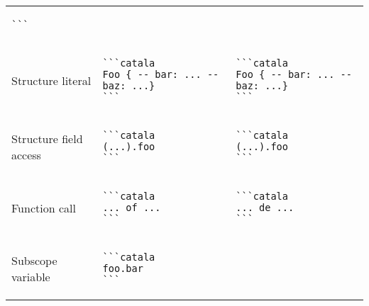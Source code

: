 \documentclass[a3paper,landscape]{article}
\begin{document}
\begin{multicols*}{2}
\begin{center}
\begin{tabular}{p{}p{}p{}}
\begin{verbatim}
```
\end{verbatim}
      \vspace*{-1.75em}
      \\
      Structure literal                 &
      \vspace*{-1.75em}
      \begin{verbatim}
```catala
Foo { -- bar: ... -- baz: ...}
```
\end{verbatim}
      \vspace*{-1.75em}
                                        &
      \vspace*{-1.75em}
      \begin{verbatim}
```catala
Foo { -- bar: ... -- baz: ...}
```
\end{verbatim}
      \vspace*{-1.75em}
      \\
      Structure field access            &
      \vspace*{-1.75em}
      \begin{verbatim}
```catala
(...).foo
```
\end{verbatim}
      \vspace*{-1.75em}
                                        &
      \vspace*{-1.75em}
      \begin{verbatim}
```catala
(...).foo
```
\end{verbatim}
      \vspace*{-1.75em}
      \\
      Function call                     &
      \vspace*{-1.75em}
      \begin{verbatim}
```catala
... of ...
```
\end{verbatim}
      \vspace*{-1.75em}
                                        &
      \vspace*{-1.75em}
      \begin{verbatim}
```catala
... de ...
```
\end{verbatim}
      \vspace*{-1.75em}
      \\
      Subscope variable                 &
      \vspace*{-1.75em}
      \begin{verbatim}
```catala
foo.bar
```
\end{verbatim}
      \vspace*{-1.75em}
                                        &

\end{tabular}
\end{center}
\end{multicols*}
\end{document}
